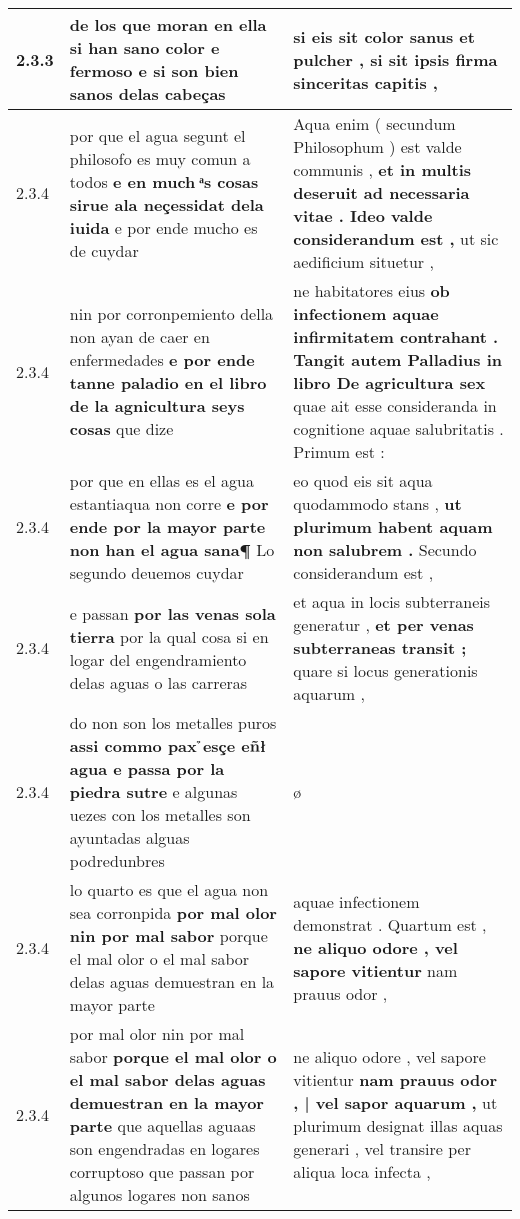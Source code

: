 \begin{tabular}{|p{1cm}|p{6.5cm}|p{6.5cm}|}
2.3.3 & de los que moran en ella \textbf{ si han sano color e fermoso } e si son bien sanos delas cabeças & si eis \textbf{ sit color sanus et pulcher , } si sit ipsis firma sinceritas capitis , \\\hline
2.3.4 & por que el agua segunt el philosofo es muy comun a todos \textbf{ e en much ͣs cosas sirue ala neçessidat dela iuida } e por ende mucho es de cuydar & Aqua enim ( secundum Philosophum ) est valde communis , \textbf{ et in multis deseruit ad necessaria vitae . Ideo valde considerandum est , } ut sic aedificium situetur , \\\hline
2.3.4 & nin por corronpemiento della non ayan de caer en enfermedades \textbf{ e por ende tanne paladio en el libro de la agnicultura seys cosas } que dize & ne habitatores eius \textbf{ ob infectionem aquae infirmitatem contrahant . Tangit autem Palladius in libro De agricultura sex } quae ait esse consideranda in cognitione aquae salubritatis . Primum est : \\\hline
2.3.4 & por que en ellas es el agua estantiaqua non corre \textbf{ e por ende por la mayor parte non han el agua sana¶ } Lo segundo deuemos cuydar & eo quod eis sit aqua quodammodo stans , \textbf{ ut plurimum habent aquam non salubrem . } Secundo considerandum est , \\\hline
2.3.4 & e passan \textbf{ por las venas sola tierra } por la qual cosa si en logar del engendramiento delas aguas o las carreras & et aqua in locis subterraneis generatur , \textbf{ et per venas subterraneas transit ; } quare si locus generationis aquarum , \\\hline
2.3.4 & do non son los metalles puros \textbf{ assi commo pax ̉esçe eñł agua e passa por la piedra sutre } e algunas uezes con los metalles son ayuntadas alguas podredunbres & ø \\\hline
2.3.4 & lo quarto es que el agua non sea corronpida \textbf{ por mal olor nin por mal sabor } porque el mal olor o el mal sabor delas aguas demuestran en la mayor parte & aquae infectionem demonstrat . Quartum est , \textbf{ ne aliquo odore , vel sapore vitientur } nam prauus odor , \\\hline
2.3.4 & por mal olor nin por mal sabor \textbf{ porque el mal olor o el mal sabor delas aguas demuestran en la mayor parte } que aquellas aguaas son engendradas en logares corruptoso que passan por algunos logares non sanos & ne aliquo odore , vel sapore vitientur \textbf{ nam prauus odor , | vel sapor aquarum , } ut plurimum designat illas aquas generari , vel transire per aliqua loca infecta , \\\hline

\end{tabular}
